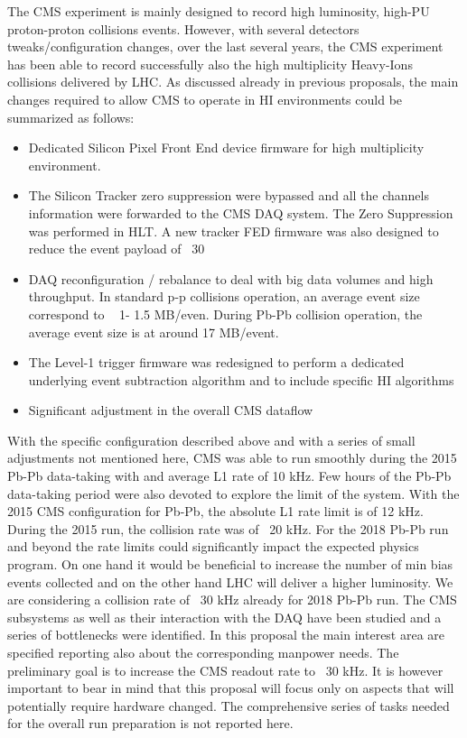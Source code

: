 \newpage


The CMS experiment is mainly designed to record high luminosity, high-PU proton-proton collisions events.  However, with
several detectors tweaks/configuration changes, over the last several years, the CMS experiment has been able to record
successfully also the high multiplicity Heavy-Ions collisions delivered by LHC. As discussed already in previous
proposals, the main changes required to allow CMS to operate in HI environments could be summarized as follows:

\begin{itemize}
\item Dedicated Silicon Pixel Front End device firmware for high multiplicity environment. 
\item The Silicon Tracker zero suppression were bypassed and all the channels information were forwarded to the CMS DAQ system. The Zero Suppression was performed in HLT. A new tracker FED firmware was also designed to reduce the event payload of ~30%
\item DAQ reconfiguration / rebalance to deal with big data volumes and high throughput. In standard p-p collisions operation, an average event size correspond to ~ 1- 1.5 MB/even. During Pb-Pb collision operation, the average event size is at around 17 MB/event. 
\item The Level-1 trigger firmware was redesigned to perform a dedicated underlying event subtraction algorithm and to include specific HI algorithms 
\item Significant adjustment in the overall CMS dataflow
\end{itemize}

With the specific configuration described above and with a series of small adjustments not mentioned here, CMS was able
to run smoothly during the 2015 Pb-Pb data-taking with and average L1 rate of 10 kHz. Few hours of the Pb-Pb data-taking
period were also devoted to explore the limit of the system.  With the 2015  CMS configuration for Pb-Pb, the absolute
L1 rate limit is of 12 kHz. During the 2015 run, the collision rate was of ~20 kHz. For the 2018 Pb-Pb run and beyond
the rate limits could significantly impact the expected physics program. On one hand it would be beneficial to increase
the number of min bias events collected and on the other hand LHC will deliver a higher luminosity. We are considering a
collision rate of ~30 kHz already for 2018 Pb-Pb run. The CMS subsystems as well as their interaction with the DAQ have
been studied and a series of bottlenecks were identified. In this proposal the main interest area are specified
reporting also about the corresponding manpower needs. The preliminary goal is to increase the CMS readout rate to ~30
kHz. It is however important to bear in mind that this proposal will focus only on aspects that will potentially require
hardware changed.  The comprehensive series of tasks needed for the overall run preparation is not reported here. 




